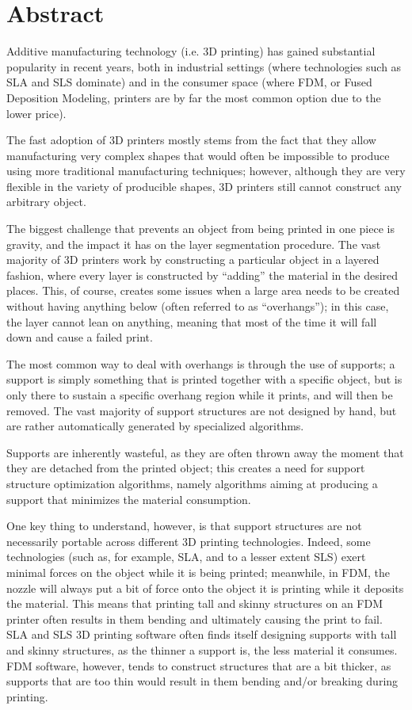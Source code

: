 \chapter*{Abstract} %
\label{abstract}



Additive manufacturing technology (i.e. 3D printing) has gained substantial popularity in recent years,
both in industrial settings (where technologies such as SLA and SLS dominate)
and in the consumer space (where FDM, or Fused Deposition Modeling, printers are
by far the most common option due to the lower price).

The fast adoption of 3D printers mostly stems from the fact that
they allow manufacturing very complex shapes that would often be impossible to produce
using more traditional manufacturing techniques; however, although they are very flexible
in the variety of producible shapes, 3D printers still cannot construct any arbitrary
object.

The biggest challenge that prevents an object from being printed in one piece
is gravity, and the impact it has on the layer segmentation procedure.
The vast majority of 3D printers work by constructing a particular object in a layered fashion,
where every layer is constructed by ``adding'' the material in the desired places.
This, of course, creates some issues when a large area needs to be created
without having anything below (often referred to as ``overhangs'');
in this case, the layer cannot lean on anything,
meaning that most of the time it will fall down and cause a failed print.

The most common way to deal with overhangs is through the use of supports;
a support is simply something that is printed together with a specific object,
but is only there to sustain a specific overhang region while it prints, and will
then be removed. The vast majority of support structures are not designed by hand,
but are rather automatically generated by specialized algorithms.

Supports are inherently wasteful, as they are often thrown away the moment that they are
detached from the printed object; this creates a need for support structure optimization
algorithms, namely algorithms aiming at producing a support that minimizes the material consumption.

One key thing to understand, however, is that support structures are not necessarily portable
across different 3D printing technologies.
Indeed, some technologies (such as, for example, SLA, and to a lesser extent SLS) exert minimal
forces on the object while it is being printed; meanwhile, in FDM, the nozzle will always
put a bit of force onto the object it is printing while it deposits the material. This means
that printing tall and skinny structures on an FDM printer often results in them bending
and ultimately causing the print to fail.
SLA and SLS 3D printing software often finds itself designing supports with
tall and skinny structures, as the thinner a support is, the less material it consumes.
FDM software, however, tends to construct structures that are a bit thicker, as supports that are too
thin would result in them bending and/or breaking during printing.


